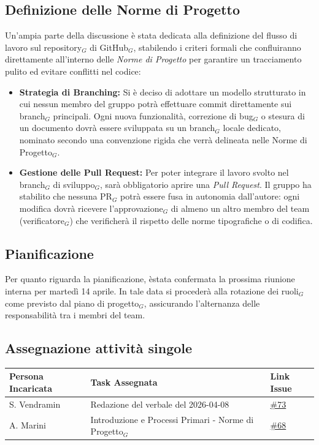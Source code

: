 \documentclass[a4paper, 10pt, colorlinks=true, linkcolor=black, urlcolor=blue, citecolor=blue, hidelinks]{article}
\newcommand{\issue}[1]{\href{https://github.com/thebitless-group-swe/thebitless.github.io/issues/#1}{\##1}}
\begin{document}
\subsection{Definizione delle Norme di Progetto}
Un'ampia parte della discussione è stata dedicata alla definizione del flusso di lavoro sul repository$_G$ di GitHub$_G$, stabilendo i criteri formali che confluiranno direttamente all'interno delle \textit{Norme di Progetto} per garantire un tracciamento pulito ed evitare conflitti nel codice:
\begin{itemize}
    \item \textbf{Strategia di Branching:} Si è deciso di adottare un modello strutturato in cui nessun membro del gruppo potrà effettuare commit direttamente sui branch$_G$ principali. Ogni nuova funzionalità, correzione di bug$_G$ o stesura di un documento dovrà essere sviluppata su un branch$_G$ locale dedicato, nominato secondo una convenzione rigida che verrà delineata nelle Norme di Progetto$_G$.
    \item \textbf{Gestione delle Pull Request:} Per poter integrare il lavoro svolto nel branch$_G$ di sviluppo$_G$, sarà obbligatorio aprire una \textit{Pull Request}. Il gruppo ha stabilito che nessuna PR$_G$ potrà essere fusa in autonomia dall'autore: ogni modifica dovrà ricevere l'approvazione$_G$ di almeno un altro membro del team (verificatore$_G$) che verificherà il rispetto delle norme tipografiche o di codifica.
\end{itemize}

\subsection{Pianificazione}
Per quanto riguarda la pianificazione, èstata confermata la prossima riunione interna per martedì 14 aprile. In tale data si procederà alla rotazione dei ruoli$_G$ come previsto dal piano di progetto$_G$, assicurando l'alternanza delle responsabilità tra i membri del team.

\subsection{Assegnazione attività singole}
\begin{center}
\renewcommand{\arraystretch}{1.4}
\begin{tabular}{|p{4.2cm}|p{6.2cm}|p{2.2cm}|}
\hline
\textbf{Persona Incaricata} & \textbf{Task Assegnata} & \centering\textbf{Link Issue} \tabularnewline
\hline
S. Vendramin & Redazione del verbale del 2026-04-08 & \centering \issue{73} \tabularnewline
\hline
A. Marini & Introduzione e Processi Primari - Norme di Progetto$_G$ & \centering \issue{68} \tabularnewline
\hline
\end{tabular}
\end{center}
\end{document}
